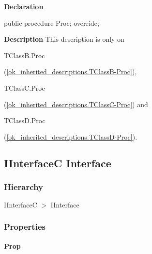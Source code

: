 \documentclass{report}
\begin{document}
\begin{list}{}{
\setlength{\itemindent}{0cm}
\setlength{\listparindent}{0cm}
\setlength{\leftmargin}{\evensidemargin}
\addtolength{\leftmargin}{\tmplength}
\settowidth{\labelsep}{X}
\addtolength{\leftmargin}{\labelsep}
\setlength{\labelwidth}{\tmplength}
}
\begin{flushleft}
\item[\textbf{Declaration}\hfill]
\begin{ttfamily}
public procedure Proc; override;\end{ttfamily}


\end{flushleft}
\par
\item[\textbf{Description}]
This description is only on \begin{ttfamily}TClassB.Proc\end{ttfamily}(\ref{ok_inherited_descriptions.TClassB-Proc}), \begin{ttfamily}TClassC.Proc\end{ttfamily}(\ref{ok_inherited_descriptions.TClassC-Proc}) and \begin{ttfamily}TClassD.Proc\end{ttfamily}(\ref{ok_inherited_descriptions.TClassD-Proc}).

\end{list}
\subsection*{IInterfaceC Interface}
\subsubsection*{\large{\textbf{Hierarchy}}\normalsize\hspace{1ex}\hfill}
IInterfaceC {$>$} IInterface
\subsubsection*{\large{\textbf{Properties}}\normalsize\hspace{1ex}\hfill}
\paragraph*{Prop}\hspace*{\fill}
\end{document}
